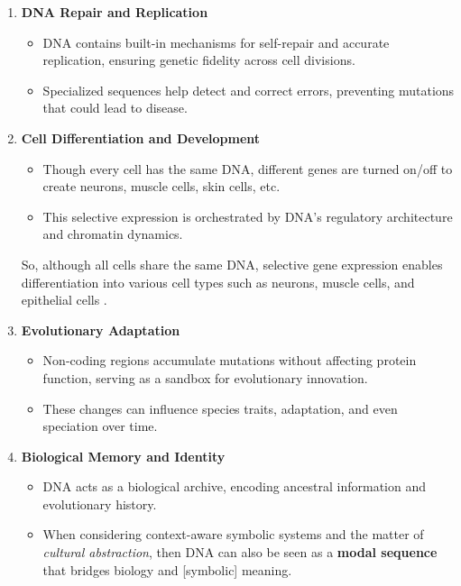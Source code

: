 \documentclass[a4paper, 18pt]{book} %
\begin{document}
\begin{appendices}
\begin{enumerate}
{    
    }

    \item{ \textbf{DNA Repair and Replication\cite{friedberg2006dna}} 
    
    \begin{itemize}
	\item DNA contains built-in mechanisms for self-repair and accurate replication, ensuring genetic fidelity across cell divisions.
	\item Specialized sequences help detect and correct errors, preventing mutations that could lead to disease.
	\end{itemize}	 

    
    
    }

    \item{ \textbf{Cell Differentiation and Development\cite{gilbert2010developmental}} 
    
        \begin{itemize}
	\item Though every cell has the same DNA, different genes are turned on/off to create neurons, muscle cells, skin cells, etc.
	\item This selective expression is orchestrated by DNA’s regulatory architecture and chromatin dynamics.
	\end{itemize}
    
    
    So, although all cells share the same DNA, selective gene expression enables differentiation into various cell types such as neurons, muscle cells, and epithelial cells .
    
    
    }

    \item{ \textbf{Evolutionary Adaptation\cite{king1975noncoding}} 
    
            \begin{itemize}
	\item Non-coding regions accumulate mutations without affecting protein function, serving as a sandbox for evolutionary innovation.
	\item These changes can influence species traits, adaptation, and even speciation over time.
	\end{itemize}
    
    
    }

    \item{ \textbf{Biological Memory and Identity\cite{jacob1977evolution}} 
    
     \begin{itemize}
	\item DNA acts as a biological archive, encoding ancestral information and evolutionary history.
	\item When considering context-aware symbolic systems and the matter of \textit{cultural abstraction}, then DNA can also be seen as a \textbf{modal sequence} that bridges biology and [symbolic] meaning.
	\end{itemize}
  
}
\end{enumerate}
\end{appendices}
\end{document}
